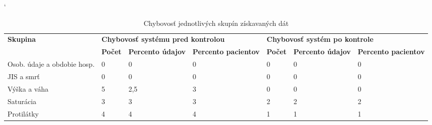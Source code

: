 \begin{table}[h!]
	\catcode`
	\caption[Chybovosť jednotlivých skupín]{Chybovosť jednotlivých skupín získavaných dát}
	\label{tab:chyby}
	
	
	\begin{tabular}{|p{2.3cm}|llp{1.9cm}|llp{1.9cm}|}
		\hline
		\multirow{2}{*}{\footnotesize{\textbf{Skupina}}} & 
		\multicolumn{3}{p{6.05cm}|}{\footnotesize{\textbf{Chybovosť systému pred kontrolou}}} & 
		\multicolumn{3}{p{5.3cm}|}{\footnotesize{\textbf{Chybovosť systém po kontrole}}}                                                      
		\\ \cline{2-7} 
		& \multicolumn{1}{p{1.4cm}|}{\footnotesize{\textbf{Počet}}} & 
		\multicolumn{1}{p{1.8cm}|}{\footnotesize{\textbf{Percento údajov}}} & 
		\footnotesize{\textbf{Percento pacientov}} & 
		\multicolumn{1}{p{1.4cm}|}{\footnotesize{\textbf{Počet}}} & 
		\multicolumn{1}{p{1.8cm}|}{\footnotesize{\textbf{Percento údajov}}} & 
		\footnotesize{\textbf{Percento pacientov}} 
		\\ \hline
		
		\footnotesize{Osob. údaje a obdobie hosp.}   &
		\multicolumn{1}{l|}{0} &
		\multicolumn{1}{l|}{0} &
		                    0  & 
		\multicolumn{1}{l|}{0} &
		\multicolumn{1}{l|}{0} & 
		                    0                           
		\\ \hline
		
		\footnotesize{JIS a smrť}   &
		\multicolumn{1}{l|}{0} &
		\multicolumn{1}{l|}{0} &
		0  & 
		\multicolumn{1}{l|}{0} &
		\multicolumn{1}{l|}{0} & 
		0                           
		\\ \hline
		
		\footnotesize{Výška a váha}   &
		\multicolumn{1}{l|}{5} &
		\multicolumn{1}{l|}{2,5} &
		3  & 
		\multicolumn{1}{l|}{0} &
		\multicolumn{1}{l|}{0} & 
		0                           
		\\ \hline
		
		\footnotesize{Saturácia}   &
		\multicolumn{1}{l|}{3} &
		\multicolumn{1}{l|}{3} &
		3  & 
		\multicolumn{1}{l|}{2} &
		\multicolumn{1}{l|}{2} & 
		2                           
		\\ \hline
		
		\footnotesize{Protilátky}   &
		\multicolumn{1}{l|}{4} &
		\multicolumn{1}{l|}{4} &
		4  & 
		\multicolumn{1}{l|}{1} &
		\multicolumn{1}{l|}{1} & 
		1                           
		\\ \hline
		

\end{tabular}
\end{table}
